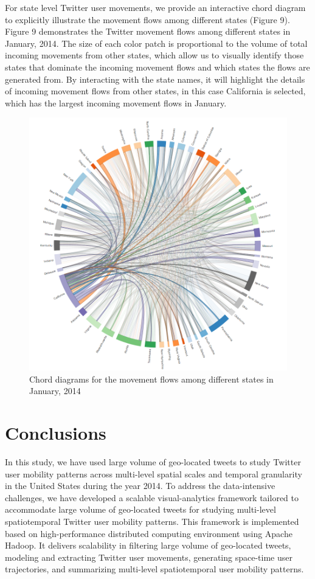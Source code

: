 \documentclass[a4paper, 11pt]{article}
\begin{document}
For state level Twitter user movements, we provide an interactive chord diagram to explicitly illustrate the movement flows among different states (Figure 9). Figure 9 demonstrates the Twitter movement flows among different states in January, 2014. The size of each color patch is proportional to the volume of total incoming movements from other states, which allow us to visually identify those states that dominate the incoming movement flows and which states the flows are generated from.
By interacting with the state names, it will highlight the details of incoming movement flows from other states, in this case California is selected, which has the largest incoming movement flows in January.\newline

\begin{figure}[h]
\centering
\includegraphics[width=1.0\linewidth]{./figures/vaca_flow}
\caption{Chord diagrams for the movement flows among different states in January, 2014}
\label{fig:vaca_movement}
\end{figure}
\FloatBarrier


\section{Conclusions}
In this study, we have used large volume of geo-located tweets to study Twitter user mobility patterns across multi-level spatial scales and temporal granularity in the United States during the year 2014. 
To address the data-intensive challenges, we have developed a scalable visual-analytics framework tailored to accommodate large volume of geo-located tweets for studying multi-level spatiotemporal Twitter user mobility patterns.
This framework is implemented based on high-performance distributed computing environment using Apache Hadoop.
It delivers scalability in filtering large volume of geo-located tweets, modeling and extracting Twitter user movements, generating space-time user trajectories, and summarizing multi-level spatiotemporal user mobility patterns.
\end{document}

